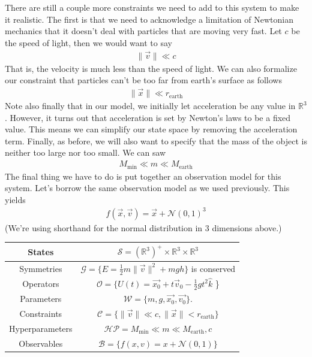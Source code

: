 \documentclass[book.tex]{subfiles}
\begin{document}
There are still a couple more constraints we need to add to this system to make it realistic. The first is that we need to acknowledge a limitation of Newtonian mechanics that it doesn't deal with particles that are moving very fast. Let $c$ be the speed of light, then we would want to say
\begin{align}
    \|\vec{v}\| \ll c
\end{align}
That is, the velocity is much less than the speed of light. We can also formalize our constraint that particles can't be too far from earth's surface as follows
\begin{align}
    \|\vec{x}\| \ll r_{\textrm{earth}}
\end{align}
Note also finally that in our model, we initially let acceleration be any value in $\mathbb{R}^3$. However, it turns out that acceleration is set by Newton's laws to be a fixed value. This means we can simplify our state space by removing the acceleration term. Finally, as before, we will also want to specify that the mass of the object is neither too large nor too small. We can saw
\begin{align}
    M_{\textrm{min}} \ll m \ll M_{\textrm{earth}}
\end{align}
The final thing we have to do is put together an observation model for this system. Let's borrow the same observation model as we used previously. This yields
\begin{align}
    f(\vec{x}, \vec{v}) = \vec{x} + \mathcal{N}(0,1)^3
\end{align}
(We're using shorthand for the normal distribution in 3 dimensions above.)

\begin{center}
\begin{tabular}{|c|c|}
    \hline
    States & $\mathcal{S} = (\mathbb{R}^3)^+ \times \mathbb{R}^3 \times \mathbb{R}^3$ \\
    \hline
    Symmetries & $\mathcal{G} = \{E = \frac{1}{2}m\|\vec{v}\|^2 + mgh\}$ is conserved \\
    \hline
    Operators & $\mathcal{O} = \{U(t) = \vec{x_0} + t \vec{v}_0 - \frac{1}{2}gt^2\hat{k}$ \}\\
    \hline
    Parameters & $\mathcal{W} = \{m, g, \vec{x_0}, \vec{v_0}\}$. \\
    \hline
    Constraints & $\mathcal{C} = \{\|\vec{v}\| \ll c, \|\vec{x}\| < r_{\textrm{earth}}\}$ \\
    \hline
    Hyperparameters & $\mathcal{HP} = {M_{\textrm{min}} \ll m \ll M_{\textrm{earth}}, c}$  \\
    \hline
    Observables & $\mathcal{B} = \{f(x, v) = x + \mathcal{N}(0, 1) \}$  \\
    \hline
\end{tabular}
\label{phs:theory:moving:particle}
\end{center}
\end{document}
